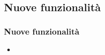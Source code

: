 \subsection{Nuove funzionalità}

\begin{frame}
    \frametitle{Nuove funzionalità}

    \begin{itemize}
        \item          

    \end{itemize}

\end{frame}